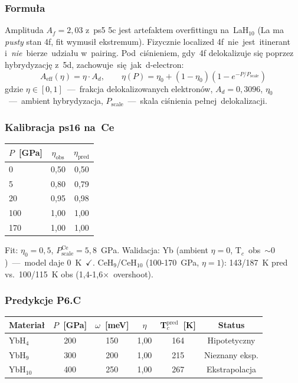 \subsubsection{Formu\l{}a}

Amplituda $A_f=2{,}03$ z~ps5 5c jest artefaktem overfittingu na~LaH$_{10}$
(La ma \emph{pusty} stan 4f, fit wymusi\l{} ekstremum). Fizycznie
localized 4f~nie~jest~itinerant i~\emph{nie}~bierze~udzia\l{}u
w~pairing. Pod~ci\'snieniem, gdy~4f delokalizuje si\k{e} poprzez
hybrydyzacj\k{e} z~5d, zachowuje~si\k{e}~jak~d-electron:
\[
  \boxed{A_\text{eff}(\eta) = \eta \cdot A_d, \qquad
  \eta(P) = \eta_0 + (1-\eta_0)(1 - e^{-P/P_\text{scale}})}
\]
gdzie $\eta\!\in\![0,1]$~---~frakcja delokalizowanych elektron\'ow,
$A_d=0{,}3096$, $\eta_0$~---~ambient hybrydyzacja, $P_\text{scale}$~---~skala
ci\'snienia pe\l{}nej~delokalizacji.

\subsubsection{Kalibracja ps16 na~Ce}

\begin{center}
\begin{tabular}{lcc}
\toprule
$P$~[GPa] & $\eta_\text{obs}$ & $\eta_\text{pred}$ \\
\midrule
0   & 0{,}50 & 0{,}50 \\
5   & 0{,}80 & 0{,}79 \\
20  & 0{,}95 & 0{,}98 \\
100 & 1{,}00 & 1{,}00 \\
170 & 1{,}00 & 1{,}00 \\
\bottomrule
\end{tabular}
\end{center}

\noindent Fit: $\eta_0=0{,}5$, $P_\text{scale}^\text{Ce}=5{,}8$~GPa.
Walidacja: Yb (ambient $\eta\!=\!0$, T$_c$~obs~$\sim\!0$)~---~model daje
0~K~$\checkmark$. CeH$_9$/CeH$_{10}$ (100-170~GPa, $\eta\!=\!1$): 143/187~K
pred vs.~100/115~K obs (1{,}4-1{,}6$\times$~overshoot).

\subsubsection{Predykcje P6.C}

\begin{center}
\begin{tabular}{lccccc}
\toprule
Materia\l{} & $P$~[GPa] & $\omega$~[meV] & $\eta$ & T$_c^\text{pred}$~[K] & Status \\
\midrule
YbH$_4$ & 200 & 150 & 1{,}00 & 164 & Hipotetyczny \\
YbH$_9$ & 300 & 200 & 1{,}00 & 215 & Nieznany eksp. \\
YbH$_{10}$ & 400 & 250 & 1{,}00 & 267 & Ekstrapolacja \\
\bottomrule
\end{tabular}
\end{center}

